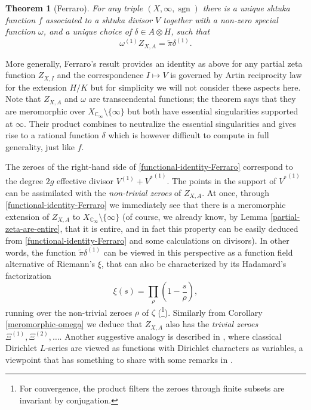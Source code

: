 \documentclass[11pt]{amsart}
\numberwithin{equation}{section}
\newcommand{\CC}{\mathbb{C}}
\newcommand{\sgn}{\operatorname{sgn}}
\newtheorem{Theorem}{Theorem}[section]
\begin{document}
\begin{Theorem}[Ferraro]\label{Ferraro-theorem}
For any triple $(X,\infty,\sgn)$ there is a unique shtuka function $f$  associated to a shtuka divisor $V$ together with a non-zero special function $\omega$, and a unique choice of $\delta\in A\otimes H$, such that 
\begin{equation}\label{functional-identity-Ferraro}
\omega^{(1)}Z_{X,A}=\widetilde{\pi}\delta^{(1)}.
\end{equation}
\end{Theorem}
More generally, Ferraro's result provides an identity as above for any partial zeta function $Z_{X,I}$ and the correspondence $I\mapsto V$ is governed by Artin reciprocity law for the extension $H/K$ but for simplicity we will not consider these aspects here. Note that $Z_{X,A}$ and $\omega$ are transcendental functions; the theorem says that they are meromorphic over $X_{\CC_\infty}\setminus\{\infty\}$ but both have essential singularities supported at $\infty$. Their product combines to neutralize the essential singularities and gives rise to a rational function $\delta$ which is however difficult to compute in full generality, just like $f$.

The zeroes of the right-hand side of \eqref{functional-identity-Ferraro} correspond to the degree $2g$ effective divisor $V^{(1)}+{V^*}^{(1)}$. The points in the support of ${V^*}^{(1)}$ can be assimilated 
with the {\em non-trivial zeroes} of $Z_{X,A}$. At once, through \eqref{functional-identity-Ferraro} we immediately see that there is a meromorphic extension of $Z_{X,A}$ to $X_{\CC_\infty}\setminus\{\infty\}$ (of course, we already know, by Lemma \ref{partial-zeta-are-entire}, that it is entire, and in fact this property can be easily deduced from \eqref{functional-identity-Ferraro} and some calculations on divisors). In other words, the function
$\widetilde{\pi}\delta^{(1)}$ can be viewed in this perspective as a function field alternative of Riemann's $\xi$, that can also be characterized by its 
Hadamard's factorization
$$\xi(s)=\prod _{\rho }\left(1-{\frac {s}{\rho }}\right),$$
running over the non-trivial zeroes $\rho$ of $\zeta$ (\footnote{For convergence, the product filters the zeroes through finite subsets are invariant by conjugation.}). Similarly from Corollary \ref{meromorphic-omega} we deduce that 
$Z_{X,A}$ also has the {\em trivial zeroes} $\Xi^{(1)},\Xi^{(2)},\ldots$. Another suggestive analogy is described in \cite[(1)]{FER1}, where classical Dirichlet $L$-series are viewed as functions with Dirichlet characters as variables, a viewpoint that has 
something to share with some remarks in \cite{PEL}. 
\end{document}
